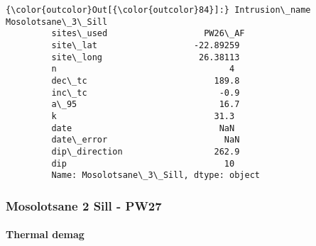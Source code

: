 \documentclass{article}
\begin{document}
            \begin{Verbatim}[commandchars=\\\{\}]
{\color{outcolor}Out[{\color{outcolor}84}]:} Intrusion\_name    Mosolotsane\_3\_Sill
         sites\_used                   PW26\_AF
         site\_lat                   -22.89259
         site\_long                   26.38113
         n                                  4
         dec\_tc                         189.8
         inc\_tc                          -0.9
         a\_95                            16.7
         k                               31.3
         date                             NaN
         date\_error                       NaN
         dip\_direction                  262.9
         dip                               10
         Name: Mosolotsane\_3\_Sill, dtype: object
\end{Verbatim}
        
    \subsubsection{Mosolotsane 2 Sill -
PW27}\label{mosolotsane-2-sill---pw27}

    \paragraph{Thermal demag}\label{thermal-demag}
\end{document}
